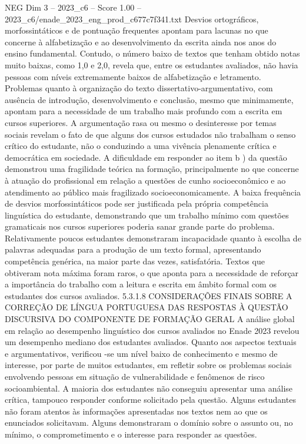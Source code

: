 \begin{textsample}{NEG Dim 3 – 2023\_c6 – Score 1.00 – 2023\_c6/enade\_2023\_eng\_prod\_c677c7f341.txt}
Desvios ortográficos, morfossintáticos e de pontuação frequentes apontam para lacunas no que concerne à alfabetização e ao desenvolvimento da escrita ainda nos anos do ensino fundamental.
Contudo, o número baixo de textos que tenham obtido notas muito baixas, como 1,0 e 2,0, revela que, entre os estudantes avaliados, não havia pessoas com níveis extremamente baixos de alfabetização e letramento.
Problemas quanto à organização do texto dissertativo-argumentativo, com ausência de introdução, desenvolvimento e conclusão, mesmo que minimamente, apontam para a necessidade de um trabalho mais profundo com a escrita em cursos superiores.
A argumentação rasa ou mesmo o desinteresse por temas sociais revelam o fato de que alguns dos cursos estudados não trabalham o senso crítico do estudante, não o conduzindo a uma vivência plenamente crítica e democrática em sociedade.
A dificuldade em responder ao item b ) da questão demonstrou uma fragilidade teórica na formação, principalmente no que concerne à atuação do profissional em relação a questões de cunho socioeconômico e ao atendimento ao público mais fragilizado socioeconomicamente.
A baixa frequência de desvios morfossintáticos pode ser justificada pela própria competência linguística do estudante, demonstrando que um trabalho mínimo com questões gramaticais nos cursos superiores poderia sanar grande parte do problema.
Relativamente poucos estudantes demonstraram incapacidade quanto à escolha de palavras adequadas para a produção de um texto formal, apresentando competência genérica, na maior parte das vezes, satisfatória.
Textos que obtiveram nota máxima foram raros, o que aponta para a necessidade de reforçar a importância do trabalho com a leitura e escrita em âmbito formal com os estudantes dos cursos avaliados. 5.3.1.8 CONSIDERAÇÕES FINAIS SOBRE A CORREÇÃO DE LÍNGUA PORTUGUESA DAS RESPOSTAS À QUESTÃO DISCURSIVA DO COMPONENTE DE FORMAÇÃO GERAL A análise global em relação ao desempenho linguístico dos cursos avaliados no Enade 2023 revelou um desempenho mediano dos estudantes avaliados.
Quanto aos aspectos textuais e argumentativos, verificou -se um nível baixo de conhecimento e mesmo de interesse, por parte de muitos estudantes, em refletir sobre os problemas sociais envolvendo pessoas em situação de vulnerabilidade e fenômenos de risco socioambiental.
A maioria dos estudantes não conseguiu apresentar uma análise crítica, tampouco responder conforme solicitado pela questão.
Alguns estudantes não foram atentos às informações apresentadas nos textos nem ao que os enunciados solicitavam.
Alguns demonstraram o domínio sobre o assunto ou, no mínimo, o comprometimento e o interesse para responder as questões.

\end{textsample}
